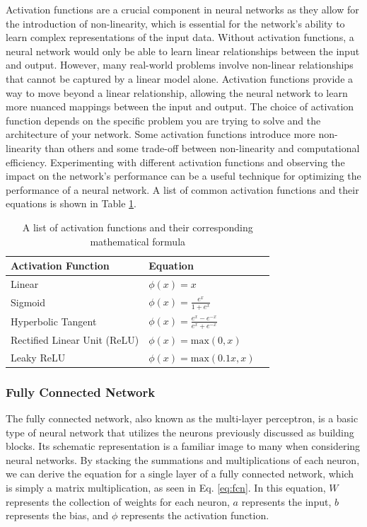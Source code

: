 Activation functions are a crucial component in neural networks as they allow for the introduction of non-linearity, which is essential for the network's ability to learn complex representations of the input data. Without activation functions, a neural network would only be able to learn linear relationships between the input and output. However, many real-world problems involve non-linear relationships that cannot be captured by a linear model alone. Activation functions provide a way to move beyond a linear relationship, allowing the neural network to learn more nuanced mappings between the input and output. The choice of activation function depends on the specific problem you are trying to solve and the architecture of your network. Some activation functions introduce more non-linearity than others and some trade-off between non-linearity and computational efficiency. Experimenting with different activation functions and observing the impact on the network's performance can be a useful technique for optimizing the performance of a neural network. A list of common activation functions and their equations is shown in Table \ref{tab:activation-functions}.

\begin{table}[H]
    \caption{A list of activation functions and their corresponding mathematical formula} \label{tab:activation-functions}
    \begin{tabularx}{\columnwidth}{|X|X|X|}
        \hline
        {\bf Activation Function} & {\bf Equation} \\ \hline 
        Linear & $\phi(x) = x$ \\\hline
        Sigmoid & $\phi(x) = \frac{e^{x}}{1 + e^{x}}$\\ \hline 
        Hyperbolic Tangent & $\phi(x) = \frac{e^x - e^{-x}}{e^{x} + e^{-x}}$\\ \hline 
        Rectified Linear Unit (ReLU) & $\phi(x) = \text{max}(0,x)$\\ \hline 
        Leaky ReLU & $\phi(x) = \text{max}(0.1x,x)$ \\ \hline 
    \end{tabularx}
\end{table}

\subsubsection{Fully Connected Network}
The fully connected network, also known as the multi-layer perceptron, is a basic type of neural network that utilizes the neurons previously discussed as building blocks. Its schematic representation is a familiar image to many when considering neural networks. By stacking the summations and multiplications of each neuron, we can derive the equation for a single layer of a fully connected network, which is simply a matrix multiplication, as seen in Eq. \ref{eq:fcn}. In this equation, $W$ represents the collection of weights for each neuron, $a$ represents the input, $b$ represents the bias, and $\phi$ represents the activation function.

